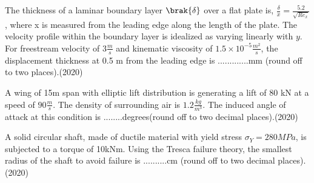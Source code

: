     \item The thickness of a laminar boundary layer $\brak{\delta}$ over a flat plate is, $\frac{\delta}{x} = \frac{5.2}{\sqrt{Re_x}}$, where x is measured from the leading edge along the length of the plate. The velocity profile within the boundary layer is idealized as varying linearly with $y$.  For freestream velocity of $3\frac{m}{s}$ and kinematic viscosity of $1.5\times 10^{-5}\frac{m^2}{s}$, the displacement thickness at 0.5 m from the leading edge is .............mm (round off to two places).\hfill (2020)
    \item A wing of 15m span with elliptic lift distribution is generating a lift of 80 kN at a speed of $90\frac{m}{s}$. The density of surrounding air is $1.2\frac{kg}{m^3}$. The induced angle of attack at this condition is ........degrees(round off to two decimal places).\hfill (2020)
    \item A solid circular shaft, made of ductile material with yield stress $\sigma_Y = 280MPa$, is subjected to a torque of 10kNm. Using the Tresca failure theory, the smallest radius of the shaft to avoid failure is ..........cm (round off to two decimal places). \hfill (2020)

